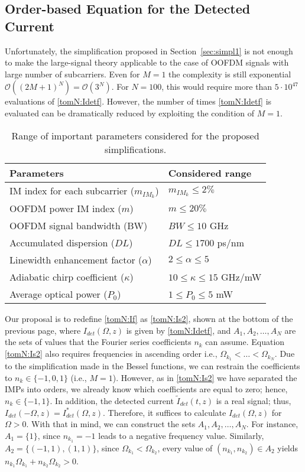 \documentclass[journal]{IEEEtran}
\begin{document}
\subsection{Order-based Equation for the Detected Current}
Unfortunately, the simplification proposed in Section~\ref{sec:simpl1} is not enough to make the large-signal theory applicable to the case of OOFDM signals with large number of subcarriers. Even for $M = 1$ the complexity is still exponential $\mathcal{O}((2M + 1)^N) = \mathcal{O}(3^N)$. For $N = 100$, this would require more than $5\cdot10^{47}$ evaluations of \eqref{tomN:Idetf}. However, the number of times \eqref{tomN:Idetf} is evaluated can be dramatically reduced by exploiting the condition of $M = 1$. %
\begin{table}[t]
\caption{Range of important parameters considered for the proposed simplifications.}
\label{tab:param}
\centering
\begin{tabular}{l|l}
\hline
Parameters & Considered range \\
\hline
IM index for each subcarrier ($m_{IM_k}$)   		   & $m_{IM_k} \leq 2\%$     \\
OOFDM power IM index ($m$) & $m \leq 20\%$ \\
OOFDM signal bandwidth (BW) & $BW \leq 10$ GHz \\
Accumulated dispersion ($DL$)  								& $DL \leq 1700$ ps/nm    \\
Linewidth enhancement factor ($\alpha$)&  $2 \leq \alpha \leq 5$   \\
Adiabatic chirp coefficient ($\kappa$)  & 	$10 \leq \kappa \leq 15$ GHz/mW     \\
Average optical power ($P_0$)														 &  $1 \leq P_0 \leq 5$ mW \\
\hline
\end{tabular}
\end{table}
Our proposal is to redefine \eqref{tomN:If} as \eqref{tomN:Is2}, shown at the bottom of the previous page, where $I_{det}(\Omega,z)$ is given by \eqref{tomN:Idetf}, and $A_1, A_2,\ldots, A_N$ are the sets of values that the Fourier series coefficients $n_k$ can assume. Equation \eqref{tomN:Is2} also requires frequencies in ascending order i.e., $\Omega_{k_1} <\ldots < \Omega_{k_N}$. Due to the simplification made in the Bessel functions, we can restrain the coefficients to $n_k\in\{-1,0,1\}$ (i.e., $M = 1$). However, as in \eqref{tomN:Is2} we have separated the IMPs into orders, we already know which coefficients are equal to zero; hence, $n_k\in\{-1,1\}$. In addition, the detected current $\tilde{I}_{det}(t,z)$ is a real signal; thus, $I_{det}(-\Omega,z) = I_{det}^*(\Omega,z)$. Therefore, it suffices to calculate $I_{det}(\Omega,z)$ for $\Omega > 0$. With that in mind, we can construct the sets $A_1, A_2,\ldots, A_N$. For instance, $A_1 = \{1\}$, since $n_{k_1} = -1$ leads to a negative frequency value. Similarly, $A_2 = \{(-1, 1), (1, 1)\}$, since $\Omega_{k_1} < \Omega_{k_2}$, every value of $(n_{k_1}, n_{k_2}) \in A_2$ yields $n_{k_1}\Omega_{k_1}+n_{k_2}\Omega_{k_2} > 0$. 
\end{document}
